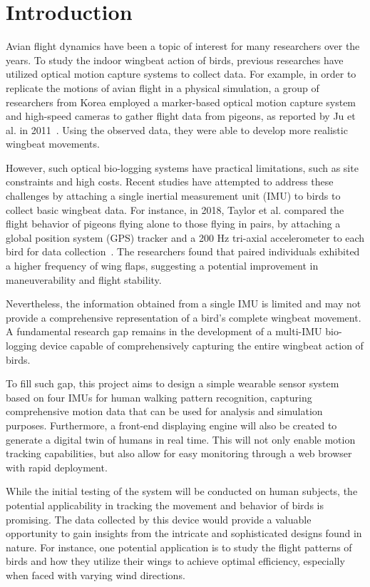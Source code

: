 \chapter{Introduction}
Avian flight dynamics have been a topic of interest for many researchers over the years.
To study the indoor wingbeat action of birds, previous researches have utilized optical motion capture systems to collect data.
For example, in order to replicate the motions of avian flight in a physical simulation, a group of researchers from Korea employed a marker-based optical motion capture system and high-speed cameras to gather flight data from pigeons, as reported by Ju et al.
in 2011~\cite{ju_data-driven_2011}.
Using the observed data, they were able to develop more realistic wingbeat movements.

However, such optical bio-logging systems have practical limitations, such as site constraints and high costs.
Recent studies have attempted to address these challenges by attaching a single inertial measurement unit (IMU) to birds to collect basic wingbeat data.
For instance, in 2018, Taylor et al.
compared the flight behavior of pigeons flying alone to those flying in pairs, by attaching a global position system (GPS) tracker and a 200 Hz tri-axial accelerometer to each bird for data collection~\cite{taylor_birds_2019}.
The researchers found that paired individuals exhibited a higher frequency of wing flaps, suggesting a potential improvement in maneuverability and flight stability.

Nevertheless, the information obtained from a single IMU is limited and may not provide a comprehensive representation of a bird's complete wingbeat movement.
A fundamental research gap remains in the development of a multi-IMU bio-logging device capable of comprehensively capturing the entire wingbeat action of birds.

To fill such gap, this project aims to design a simple wearable sensor system based on four IMUs for human walking pattern recognition, capturing comprehensive motion data that can be used for analysis and simulation purposes.
Furthermore, a front-end displaying engine will also be created to generate a digital twin of humans in real time.
This will not only enable motion tracking capabilities, but also allow for easy monitoring through a web browser with rapid deployment.

While the initial testing of the system will be conducted on human subjects, the potential applicability in tracking the movement and behavior of birds is promising.
The data collected by this device would provide a valuable opportunity to gain insights from the intricate and sophisticated designs found in nature.
For instance, one potential application is to study the flight patterns of birds and how they utilize their wings to achieve optimal efficiency, especially when faced with varying wind directions.


